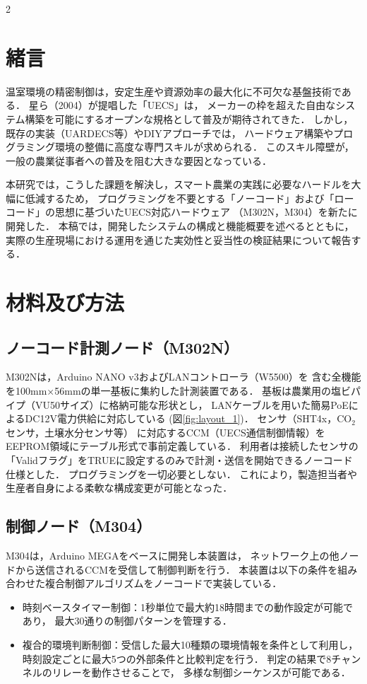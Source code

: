 \documentclass{jsaishoshiki}
\begin{document}
\setlength{\columnsep}{10mm}
\begin{multicols}{2}
  
\section{緒言}
温室環境の精密制御は，安定生産や資源効率の最大化に不可欠な基盤技術である．%
星ら（2004）が提唱した「UECS」は，%
メーカーの枠を超えた自由なシステム構築を可能にするオープンな規格として普及が期待されてきた．%
しかし，既存の実装（UARDECS等）やDIYアプローチでは，%
ハードウェア構築やプログラミング環境の整備に高度な専門スキルが求められる．%
このスキル障壁が，一般の農業従事者への普及を阻む大きな要因となっている．

本研究では，こうした課題を解決し，スマート農業の実践に必要なハードルを大幅に低減するため，%
プログラミングを不要とする「ノーコード」および「ローコード」の思想に基づいたUECS対応ハードウェア%
（M302N，M304）を新たに開発した．
本稿では，開発したシステムの構成と機能概要を述べるとともに，%
実際の生産現場における運用を通じた実効性と妥当性の検証結果について報告する．

\section{材料及び方法}
\subsection{ノーコード計測ノード（M302N）}
M302Nは，Arduino NANO v3およびLANコントローラ（W5500）を%
含む全機能を100mm×56mmの単一基板に集約した計測装置である．
基板は農業用の塩ビパイプ（VU50サイズ）に格納可能な形状とし，
LANケーブルを用いた簡易PoEによるDC12V電力供給に対応している
(図\ref{fig:layout_1})．
センサ（SHT4x，CO$_2$センサ，土壌水分センサ等）%
に対応するCCM（UECS通信制御情報）をEEPROM領域にテーブル形式で事前定義している．
利用者は接続したセンサの「Validフラグ」をTRUEに設定するのみで計測・送信を開始できるノーコード仕様とした．
プログラミングを一切必要としない．
これにより，製造担当者や生産者自身による柔軟な構成変更が可能となった．

\subsection{制御ノード（M304）}
M304は，Arduino MEGAをベースに開発し本装置は，%
ネットワーク上の他ノードから送信されるCCMを受信して制御判断を行う．
本装置は以下の条件を組み合わせた複合制御アルゴリズムをノーコードで実装している．
\begin{itemize}
\item 時刻ベースタイマー制御：1秒単位で最大約18時間までの動作設定が可能であり，%
  最大30通りの制御パターンを管理する．
\item 複合的環境判断制御：受信した最大10種類の環境情報を条件として利用し，%
  時刻設定ごとに最大5つの外部条件と比較判定を行う．%
  判定の結果で8チャンネルのリレーを動作させることで，%
  多様な制御シーケンスが可能である．
\end{itemize}


\end{multicols}
\end{document}
